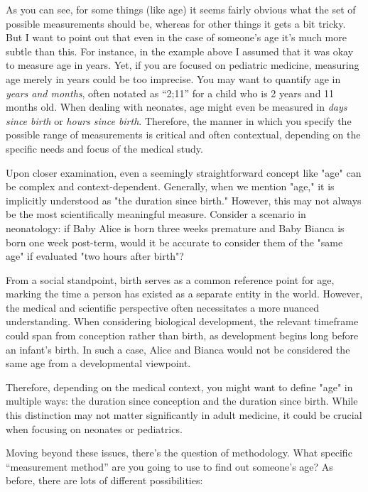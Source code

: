 As you can see, for some things (like age) it seems fairly obvious what the set of possible measurements should be, whereas for other things it gets a bit tricky. But I want to point out that even in the case of someone's age it's much more subtle than this. For instance, in the example above I assumed that it was okay to measure age in years. Yet, if you are focused on pediatric medicine, measuring age merely in years could be too imprecise. You may want to quantify age in \textit{years and months}, often notated as ``2;11'' for a child who is 2 years and 11 months old. When dealing with neonates, age might even be measured in \textit{days since birth} or \textit{hours since birth}. Therefore, the manner in which you specify the possible range of measurements is critical and often contextual, depending on the specific needs and focus of the medical study.

Upon closer examination, even a seemingly straightforward concept like "age" can be complex and context-dependent. Generally, when we mention "age," it is implicitly understood as "the duration since birth." However, this may not always be the most scientifically meaningful measure. Consider a scenario in neonatology: if Baby Alice is born three weeks premature and Baby Bianca is born one week post-term, would it be accurate to consider them of the "same age" if evaluated "two hours after birth"? 

From a social standpoint, birth serves as a common reference point for age, marking the time a person has existed as a separate entity in the world. However, the medical and scientific perspective often necessitates a more nuanced understanding. When considering biological development, the relevant timeframe could span from conception rather than birth, as development begins long before an infant's birth. In such a case, Alice and Bianca would not be considered the same age from a developmental viewpoint.

Therefore, depending on the medical context, you might want to define "age" in multiple ways: the duration since conception and the duration since birth. While this distinction may not matter significantly in adult medicine, it could be crucial when focusing on neonates or pediatrics.


Moving beyond these issues, there's the question of methodology. What specific ``measurement method'' are you going to use to find out someone's age? As before, there are lots of different possibilities:

